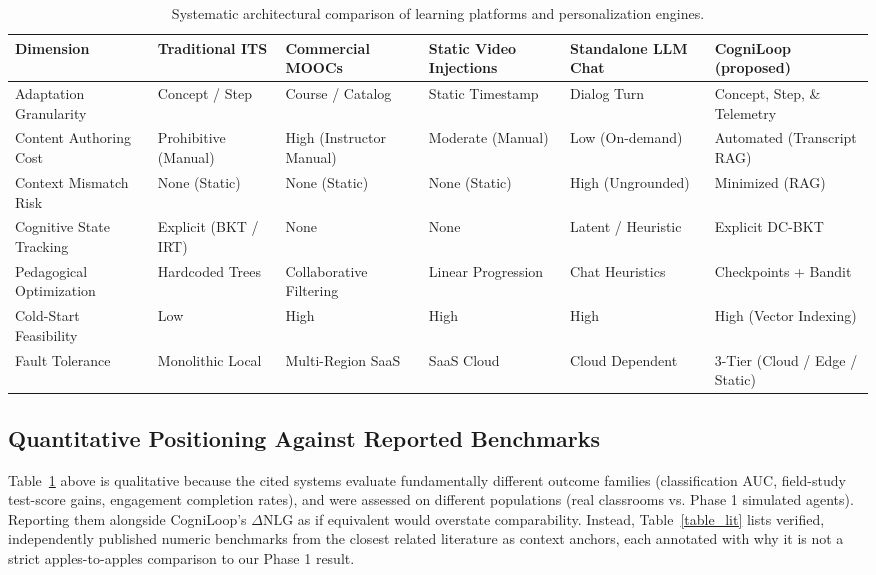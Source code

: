 \documentclass[notitlepage,12pt]{jedm}
\begin{document}
\begin{table}
\caption{Systematic architectural comparison of learning platforms and personalization engines.}
\label{table_comp}
\centering
\small
\renewcommand{\arraystretch}{1.3}
\setlength{\tabcolsep}{5pt}
\begin{tabular}{|p{2.4cm}|p{2.0cm}|p{2.1cm}|p{2.0cm}|p{2.1cm}|p{2.7cm}|}
\hline
\textbf{Dimension} & \textbf{Traditional ITS} \cite{koedinger1997intelligent} & \textbf{Commercial MOOCs} \cite{lan2016reinforcement} & \textbf{Static Video Injections} & \textbf{Standalone LLM Chat} & \textbf{CogniLoop (proposed)} \\
\hline
Adaptation Granularity & Concept / Step & Course / Catalog & Static Timestamp & Dialog Turn & Concept, Step, \& Telemetry \\
\hline
Content Authoring Cost & Prohibitive (Manual) & High (Instructor Manual) & Moderate (Manual) & Low (On-demand) & Automated (Transcript RAG) \\
\hline
Context Mismatch Risk & None (Static) & None (Static) & None (Static) & High (Ungrounded) & Minimized (RAG) \\
\hline
Cognitive State Tracking & Explicit (BKT / IRT) & None & None & Latent / Heuristic & Explicit DC-BKT \\
\hline
Pedagogical Optimization & Hardcoded Trees & Collaborative Filtering & Linear Progression & Chat Heuristics & Checkpoints + Bandit \\
\hline
Cold-Start Feasibility & Low & High & High & High & High (Vector Indexing) \\
\hline
Fault Tolerance & Monolithic Local & Multi-Region SaaS & SaaS Cloud & Cloud Dependent & 3-Tier (Cloud / Edge / Static) \\
\hline
\end{tabular}
\renewcommand{\arraystretch}{1.0}
\end{table}

\subsection{Quantitative Positioning Against Reported Benchmarks}
Table~\ref{table_comp} above is qualitative because the cited systems evaluate fundamentally different outcome families (classification AUC, field-study test-score gains, engagement completion rates), and were assessed on different populations (real classrooms vs. Phase 1 simulated agents). Reporting them alongside CogniLoop's $\Delta\text{NLG}$ as if equivalent would overstate comparability. Instead, Table~\ref{table_lit} lists verified, independently published numeric benchmarks from the closest related literature as context anchors, each annotated with why it is not a strict apples-to-apples comparison to our Phase 1 result.
\end{document}
